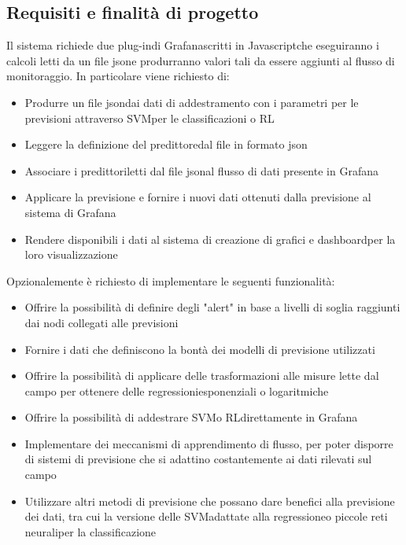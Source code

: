 \subsection{Requisiti e finalità di progetto}
Il sistema richiede due plug-in\glosp di Grafana\glosp scritti in Javascript\glosp che eseguiranno i calcoli letti da un file json\glosp e produrranno valori tali da essere aggiunti al flusso di monitoraggio. In particolare viene richiesto di:
\begin{itemize}
	\item Produrre un file json\glosp dai dati di addestramento con i parametri per le previsioni attraverso SVM\glosp per le classificazioni o RL\glo
	\item Leggere la definizione del predittore\glosp dal file in formato json\glo
	\item Associare i predittori\glosp letti dal file json\glosp al flusso di dati presente in Grafana\glo
	\item Applicare la previsione e fornire i nuovi dati ottenuti dalla previsione al sistema di Grafana\glo
	\item Rendere disponibili i dati al sistema di creazione di grafici e dashboard\glosp per la loro visualizzazione
\end{itemize}
Opzionalemente è richiesto di implementare le seguenti funzionalità:
\begin{itemize}
	\item Offrire la possibilità di definire degli "alert\glo" in base a livelli di soglia raggiunti dai nodi collegati alle previsioni
	\item Fornire i dati che definiscono la bontà dei modelli di previsione utilizzati
	\item Offrire la possibilità di applicare delle trasformazioni alle misure lette dal campo per ottenere delle regressioni\glosp esponenziali o logaritmiche
	\item Offrire la possibilità di addestrare SVM\glosp o RL\glosp direttamente in Grafana\glo
	\item Implementare dei meccanismi di apprendimento di flusso, per poter disporre di sistemi di previsione che si adattino costantemente ai dati rilevati sul campo
	\item Utilizzare altri metodi di previsione che possano dare benefici alla previsione dei dati, tra cui la versione delle SVM\glosp adattate alla regressione\glosp o piccole reti neurali\glosp per la classificazione
\end{itemize}

